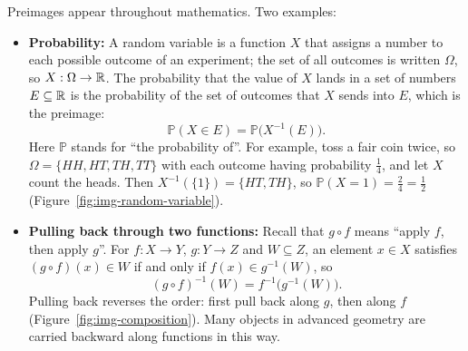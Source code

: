 Preimages appear throughout mathematics. Two examples:
\begin{itemize}
\item \textbf{Probability:} A random variable is a function $X$ that assigns a number to each possible outcome of an experiment; the set of all outcomes is written $\Omega$, so $X: \Omega \to \mathbb{R}$. The probability that the value of $X$ lands in a set of numbers $E \subseteq \mathbb{R}$ is the probability of the set of outcomes that $X$ sends into $E$, which is the preimage:
\[
\mathbb{P}(X \in E) = \mathbb{P}\bigl(X^{-1}(E)\bigr).
\]
Here $\mathbb{P}$ stands for ``the probability of''. For example, toss a fair coin twice, so $\Omega = \{HH, HT, TH, TT\}$ with each outcome having probability $\tfrac14$, and let $X$ count the heads. Then $X^{-1}(\{1\}) = \{HT, TH\}$, so $\mathbb{P}(X = 1) = \tfrac24 = \tfrac12$ (Figure~\ref{fig:img-random-variable}).
\item \textbf{Pulling back through two functions:} Recall that $g \circ f$ means ``apply $f$, then apply $g$''. For $f: X \to Y$, $g: Y \to Z$ and $W \subseteq Z$, an element $x \in X$ satisfies $(g \circ f)(x) \in W$ if and only if $f(x) \in g^{-1}(W)$, so
\[
(g \circ f)^{-1}(W) = f^{-1}\bigl(g^{-1}(W)\bigr).
\]
Pulling back reverses the order: first pull back along $g$, then along $f$ (Figure~\ref{fig:img-composition}). Many objects in advanced geometry are carried backward along functions in this way.
\end{itemize}

